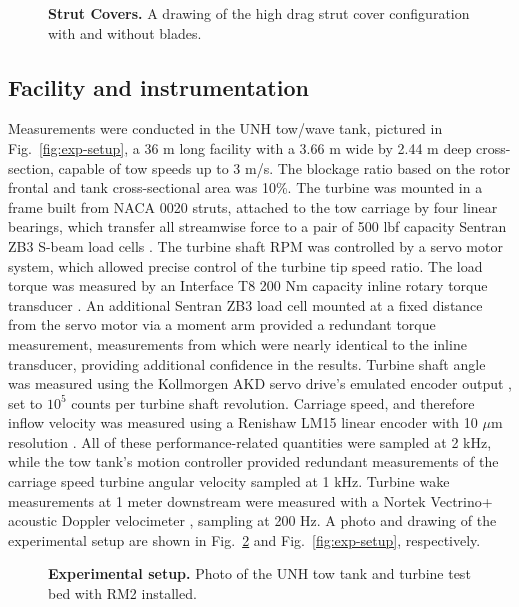 \documentclass[10pt,letterpaper]{article}
\begin{document}
\begin{figure}

    \caption{{\bf Strut Covers.} A drawing of the high drag strut cover
        configuration with and without blades.}

    \label{fig:covers}
\end{figure}


\subsection*{Facility and instrumentation}

Measurements were conducted in the UNH tow/wave tank, pictured in
Fig.~\ref{fig:exp-setup}, a 36 m long facility with a 3.66 m wide by 2.44 m deep
cross-section, capable of tow speeds up to 3 m/s. The blockage ratio based on
the rotor frontal and tank cross-sectional area was 10\%. The turbine was
mounted in a frame built from NACA 0020 struts, attached to the tow carriage by
four linear bearings, which transfer all streamwise force to a pair of 500 lbf
capacity Sentran ZB3 S-beam load cells \cite{SentranZB}. The turbine shaft RPM
was controlled by a servo motor system, which allowed precise control of the
turbine tip speed ratio. The load torque was measured by an Interface T8 200 Nm
capacity inline rotary torque transducer \cite{InterfaceT8}. An additional
Sentran ZB3 load cell mounted at a fixed distance from the servo motor via a
moment arm provided a redundant torque measurement, measurements from which were
nearly identical to the inline transducer, providing additional confidence in
the results. Turbine shaft angle was measured using the Kollmorgen AKD servo
drive's emulated encoder output \cite{KollmorgenAKD}, set to $10^5$ counts per
turbine shaft revolution. Carriage speed, and therefore inflow velocity was
measured using a Renishaw LM15 linear encoder with 10 $\mu$m resolution
\cite{RenishawLM15}. All of these performance-related quantities were sampled at
2 kHz, while the tow tank's motion controller provided redundant measurements of
the carriage speed turbine angular velocity sampled at 1 kHz. Turbine wake
measurements at 1 meter downstream were measured with a Nortek Vectrino+
acoustic Doppler velocimeter \cite{NortekVectrino}, sampling at 200 Hz. A photo
and drawing of the experimental setup are shown in
Fig.~\ref{fig:exp-setup-photo} and Fig.~\ref{fig:exp-setup}, respectively.

\begin{figure}
    \centering


    \caption{\textbf{Experimental setup.} Photo of the UNH tow tank and turbine
    test bed with RM2 installed.}

    \label{fig:exp-setup-photo}
\end{figure}
\end{document}
